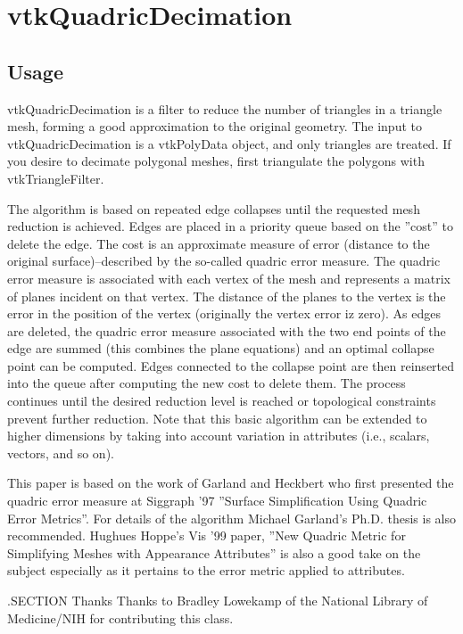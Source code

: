 \section{vtkQuadricDecimation}

\subsection{Usage}

 vtkQuadricDecimation is a filter to reduce the number of triangles in
 a triangle mesh, forming a good approximation to the original geometry. 
 The input to vtkQuadricDecimation is a vtkPolyData object, and only
 triangles are treated. If you desire to decimate polygonal meshes, first
 triangulate the polygons with vtkTriangleFilter.

 The algorithm is based on repeated edge collapses until the requested mesh
 reduction is achieved. Edges are placed in a priority queue based on the
 ''cost'' to delete the edge. The cost is an approximate measure of error
 (distance to the original surface)--described by the so-called quadric
 error measure. The quadric error measure is associated with each vertex of
 the mesh and represents a matrix of planes incident on that vertex. The
 distance of the planes to the vertex is the error in the position of the
 vertex (originally the vertex error iz zero). As edges are deleted, the
 quadric error measure associated with the two end points of the edge are
 summed (this combines the plane equations) and an optimal collapse point
 can be computed. Edges connected to the collapse point are then reinserted
 into the queue after computing the new cost to delete them. The process
 continues until the desired reduction level is reached or topological
 constraints prevent further reduction. Note that this basic algorithm can
 be extended to higher dimensions by
 taking into account variation in attributes (i.e., scalars, vectors, and
 so on).

 This paper is based on the work of Garland and Heckbert who first
 presented the quadric error measure at Siggraph '97 ''Surface
 Simplification Using Quadric Error Metrics''. For details of the algorithm
 Michael Garland's Ph.D. thesis is also recommended. Hughues Hoppe's Vis
 '99 paper, ''New Quadric Metric for Simplifying Meshes with Appearance
 Attributes'' is also a good take on the subject especially as it pertains
 to the error metric applied to attributes.

 .SECTION Thanks
 Thanks to Bradley Lowekamp of the National Library of Medicine/NIH for
 contributing this class.

